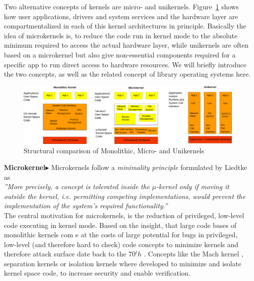 Two alternative concepts of kernels are micro- and unikernels. Figure~\ref{fig:kernels} shows how user applications, drivers and system services and the hardware layer are compartmentalized in each of this kernel architectures in principle. Basically the idea of microkernels is, to reduce the code run in kernel mode to the absolute minimum required to access the actual hardware layer, while unikernels are often based on a microkernel but also give non-essential components required for a specific app to run direct access to hardware resources. We will briefly introduce the two concepts, as well as the related concept of library operating systems here.

\begin{figure}[H]
    \centering
    \includegraphics[scale= 0.36]{figures/kernels.png}
    \caption{Structural comparison of Monolithic, Micro- and Unikernels }
    \label{fig:kernels}
\end{figure}

\textbf{Microkernel$\blacktriangleright$} Microkernels follow a \textit{minimality principle} formulated by Liedtke~\cite{jochen1995mu} as \\

\emph{''More precisely, a concept is tolerated inside the $\mu$-kernel only if moving it outside the kernel, i.e. permitting competing implementations, would prevent the implementation of the system's required functionality.''}\\

The central motivation for microkernels, is the reduction of privileged, low-level code executing in kernel mode. Based on the insight, that large code bases of monolithic kernels com e at the costs of large potential for bugs in privileged, low-level (and therefore hard to check) code concepts to minimize kernels and therefore attack surface date back to the 70$^th$ \cite{hansen1970nucleus}. Concepts like the Mach kernel \cite{accetta1986mach}, separation kernels\cite{rushby1981design} or isolation kernels \cite{whitaker2002scale} where developed to minimize and isolate kernel space code, to increase security and enable verification.  

